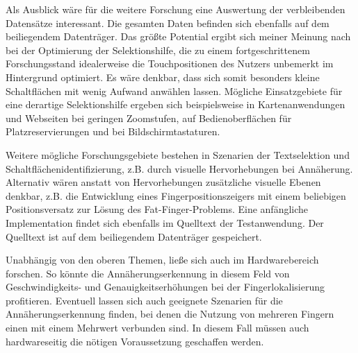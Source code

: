 \documentclass[12pt,numbers=noenddot,parskip,bibliography=totocnumbered,listof=totocnumbered]{scrreprt}
\begin{document}
Als Ausblick wäre für die weitere Forschung eine Auswertung der verbleibenden Datensätze interessant. Die gesamten Daten befinden sich ebenfalls auf dem beiliegendem Datenträger. Das größte Potential ergibt sich meiner Meinung nach bei der Optimierung der Selektionshilfe, die zu einem fortgeschrittenem Forschungsstand idealerweise die Touchpositionen des Nutzers unbemerkt im Hintergrund optimiert. Es wäre denkbar, dass sich somit besonders kleine Schaltflächen mit wenig Aufwand anwählen lassen. Mögliche Einsatzgebiete für eine derartige Selektionshilfe ergeben sich beispielsweise in Kartenanwendungen und Webseiten bei geringen Zoomstufen, auf Bedienoberflächen für Platzreservierungen und bei Bildschirmtastaturen.

Weitere mögliche Forschungsgebiete bestehen in Szenarien der Textselektion und Schaltflächenidentifizierung, z.B. durch visuelle Hervorhebungen bei Annäherung.\\
Alternativ wären anstatt von Hervorhebungen zusätzliche visuelle Ebenen denkbar, z.B. die Entwicklung eines Fingerpositionszeigers mit einem beliebigen Positionsversatz zur Lösung des Fat-Finger-Problems. Eine anfängliche Implementation findet sich ebenfalls im Quelltext der Testanwendung. Der Quelltext ist auf dem beiliegendem Datenträger gespeichert.

Unabhängig von den oberen Themen, ließe sich auch im Hardwarebereich forschen. So könnte die Annäherungserkennung in diesem Feld von Geschwindigkeits- und Genauigkeitserhöhungen bei der Fingerlokalisierung profitieren. Eventuell lassen sich auch geeignete Szenarien für die Annäherungserkennung finden, bei denen die Nutzung von mehreren Fingern einen mit einem Mehrwert verbunden sind. In diesem Fall müssen auch hardwareseitig die nötigen Voraussetzung geschaffen werden.
\end{document}
